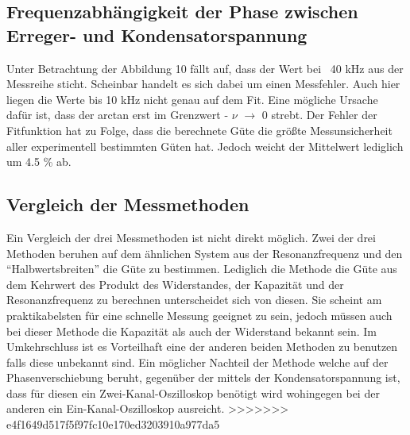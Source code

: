 \subsection{Frequenzabhängigkeit der Phase zwischen Erreger- und
Kondensatorspannung}
Unter Betrachtung der Abbildung 10 fällt auf, dass der Wert bei ~40 kHz aus der Messreihe sticht. Scheinbar handelt es sich dabei um einen Messfehler. Auch hier liegen die Werte bis 10 kHz nicht genau auf dem Fit. Eine  mögliche Ursache dafür ist, dass der arctan erst im Grenzwert - $\nu$ $\rightarrow$ 0 strebt. Der Fehler der Fitfunktion hat zu Folge, dass die berechnete Güte die größte Messunsicherheit aller experimentell bestimmten Güten hat. Jedoch weicht der Mittelwert lediglich um 4.5 \% ab.
\subsection{Vergleich der Messmethoden}
Ein Vergleich der drei Messmethoden ist nicht direkt möglich. Zwei der drei Methoden beruhen auf dem ähnlichen System aus der Resonanzfrequenz und den ``Halbwertsbreiten'' die Güte zu bestimmen. Lediglich die Methode die Güte aus dem Kehrwert des Produkt des Widerstandes, der Kapazität und der Resonanzfrequenz zu berechnen unterscheidet sich von diesen. Sie scheint am praktikabelsten für eine schnelle Messung geeignet zu sein, jedoch müssen auch bei dieser Methode die Kapazität als auch der Widerstand bekannt sein. Im Umkehrschluss ist es Vorteilhaft eine der anderen beiden Methoden zu benutzen falls diese unbekannt sind. Ein möglicher Nachteil der Methode welche auf der Phasenverschiebung beruht, gegenüber der mittels der Kondensatorspannung ist, dass für diesen ein Zwei-Kanal-Oszilloskop benötigt wird wohingegen bei der anderen ein Ein-Kanal-Oszilloskop ausreicht.
>>>>>>> e4f1649d517f5f97fc10e170ed3203910a977da5
